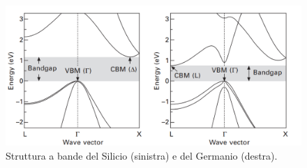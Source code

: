 \begin{figure}[h!]
    \centering
    \includegraphics[width=\linewidth]{Images/Si&Ge_BandStructure.png}
    \caption{Struttura a bande del Silicio (sinistra) e del Germanio (destra).}
    \label{fig:my_label}
\end{figure}